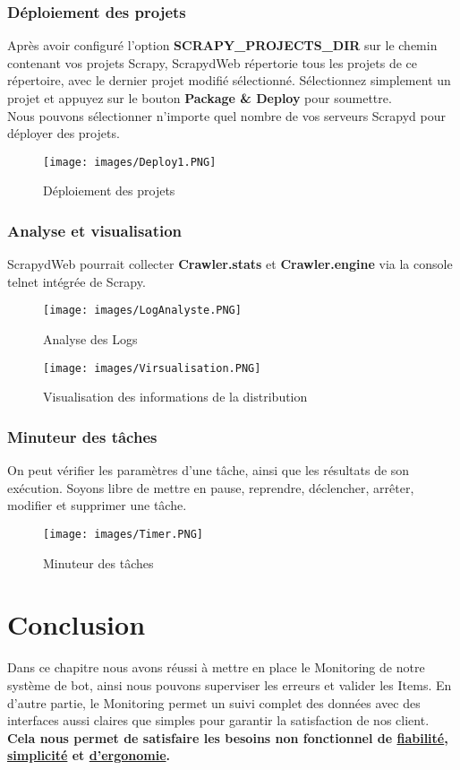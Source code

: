 \subsubsection{Déploiement des projets}
Après avoir configuré l'option \textbf{SCRAPY\_PROJECTS\_DIR} sur le chemin contenant vos projets Scrapy, ScrapydWeb répertorie tous les projets de ce répertoire, avec le dernier projet modifié sélectionné. Sélectionnez simplement un projet et appuyez sur le bouton \textbf{Package \& Deploy} pour soumettre.\\
Nous pouvons sélectionner n'importe quel nombre de vos serveurs Scrapyd pour déployer des projets.
\begin{figure}[H]
    \centering
    \texttt{[image: images/Deploy1.PNG]}
    \caption{Déploiement des projets}
    \label{fig:config2}  
    \end{figure}
\subsubsection{Analyse et visualisation}
ScrapydWeb pourrait collecter \textbf{Crawler.stats} et \textbf{Crawler.engine} via la console telnet intégrée de Scrapy.
\begin{figure}[H]
    \centering
    \texttt{[image: images/LogAnalyste.PNG]}
    \caption{Analyse des Logs}
    \label{fig:LogA}  
    \end{figure}
\begin{figure}[H]
    \centering
    \texttt{[image: images/Virsualisation.PNG]}
    \caption{Visualisation des informations de la distribution}
    \label{fig:config2}  
    \end{figure}
\subsubsection{Minuteur des tâches}
On peut vérifier les paramètres d'une tâche, ainsi que les résultats de son exécution.
Soyons libre de mettre en pause, reprendre, déclencher, arrêter, modifier et supprimer une tâche.
\begin{figure}[H]
    \centering
    \texttt{[image: images/Timer.PNG]}
    \caption{Minuteur des tâches}
    \label{fig:config2}  
    \end{figure}
\section*{Conclusion}
Dans ce chapitre nous avons réussi à mettre en place le Monitoring de notre système de bot, ainsi nous pouvons superviser les erreurs et valider les Items. En d’autre partie, le Monitoring permet un suivi complet des données avec des interfaces aussi claires que simples pour garantir la satisfaction de nos client. \\\textbf{Cela nous permet de satisfaire les besoins non fonctionnel de \underline{fiabilité}, \underline{simplicité} et \underline{d'ergonomie}.}
